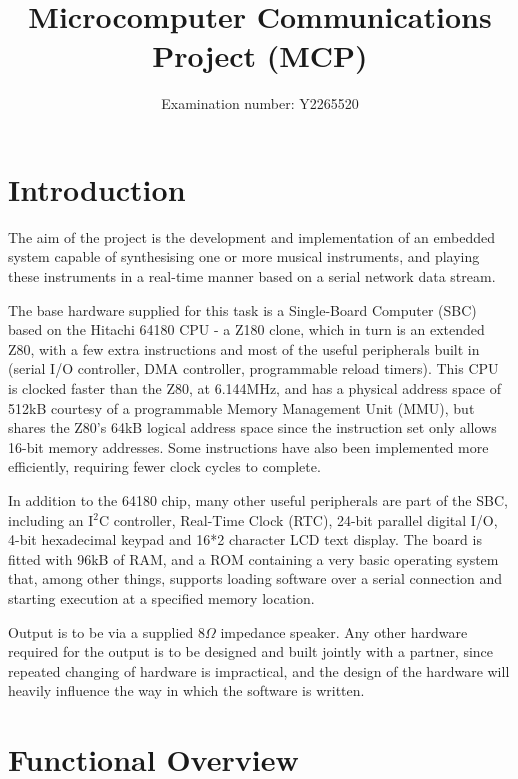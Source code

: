 \documentclass[a4paper,10pt]{article}
\title{Microcomputer Communications Project (MCP)}
\author{Examination number: Y2265520}
\begin{document}
\maketitle
\pagebreak
\tableofcontents
\pagebreak


\section{Introduction}

The aim of the project is the development and implementation of an embedded system capable of 
synthesising one or more musical instruments, and playing these instruments in a real-time manner 
based on a serial network data stream.

The base hardware supplied for this task is a Single-Board Computer (SBC) based on the Hitachi 64180 
CPU - a Z180 clone, which in turn is an extended Z80, with a few extra instructions and most of the 
useful peripherals built in (serial I/O controller, DMA controller, programmable reload timers).  
This CPU is clocked faster than the Z80, at 6.144MHz, and has a physical address space of 512kB 
courtesy of a programmable Memory Management Unit (MMU), but shares the Z80's 64kB logical address 
space since the instruction set only allows 16-bit memory addresses.  Some instructions have also 
been implemented more efficiently, requiring fewer clock cycles to complete.

In addition to the 64180 chip, many other useful peripherals are part of the SBC, including an 
I$^{2}$C controller, Real-Time Clock (RTC), 24-bit parallel digital I/O, 4-bit hexadecimal keypad 
and 16*2 character LCD text display.  The board is fitted with 96kB of RAM, and a ROM containing a 
very basic operating system that, among other things, supports loading software over a serial 
connection and starting execution at a specified memory location.

Output is to be via a supplied $8\Omega$ impedance speaker.  Any other hardware required for the 
output is to be designed and built jointly with a partner, since repeated changing of hardware is 
impractical, and the design of the hardware will heavily influence the way in which the software is 
written.

\section{Functional Overview}
\end{document}
